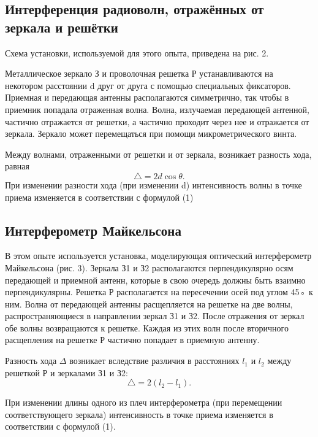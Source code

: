 \documentclass[a4paper, 12pt]{article}
\begin{document}
\subsection{Интерференция радиоволн, отражённых от зеркала и решётки}
Схема установки, используемой для этого опыта, приведена на рис. 2. \par
Металлическое зеркало З и проволочная решетка Р устанавливаются на некотором расстоянии d
друг от друга с помощью специальных фиксаторов. Приемная и передающая антенны располагаются
симметрично, так чтобы в приемник попадала отраженная волна.
Волна, излучаемая передающей антенной, частично отражается от решетки, а частично проходит через нее и отражается от зеркала. Зеркало может перемещаться при помощи микрометрического винта. \par 
Между волнами, отраженными от решетки и от зеркала, возникает разность хода, равная
\begin{equation}
    \triangle = 2 d \cos \theta.
\end{equation}
При изменении разности хода (при изменении d) интенсивность волны в точке приема изменяется в соответствии с формулой (1)

\subsection{Интерферометр Майкельсона}
В этом опыте используется установка, моделирующая оптический интерферометр Майкельсона (рис. 3). Зеркала З1 и З2 располагаются перпендикулярно осям
передающей и приемной антенн, которые в свою очередь должны быть взаимно перпендикулярны. Решетка Р располагается на пересечении осей под углом 45◦ к ним. Волна от передающей антенны
расщепляется на решетке на две волны, распространяющиеся в направлении зеркал З1 и З2. После отражения от зеркал обе волны
возвращаются к решетке. Каждая из этих волн после вторичного расщепления на решетке Р частично попадает в приемную антенну. \par

Разность хода $\Delta$ возникает вследствие различия в расстояниях
$l_1$ и $l_2$ между решеткой Р и зеркалами З1 и З2:
\begin{equation}
    \triangle = 2 (l_2 - l_1).
\end{equation}

При изменении длины одного из плеч интерферометра (при перемещении соответствующего зеркала) интенсивность в точке
приема изменяется в соответствии с формулой (1). \par
\end{document}
